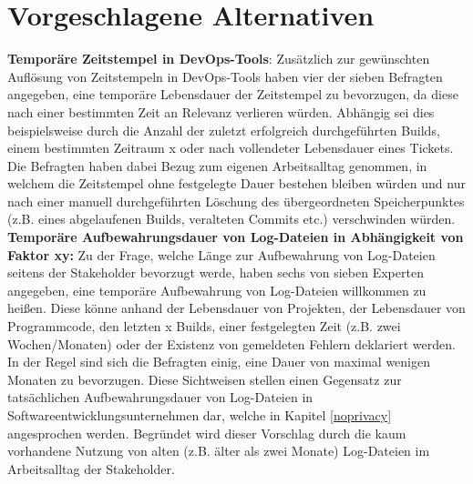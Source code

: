 \section{Vorgeschlagene Alternativen} \label{alternatives}
\textbf{Temporäre Zeitstempel in DevOps-Tools}: \newline
Zusätzlich zur gewünschten Auflösung von Zeitstempeln in DevOps-Tools haben vier der sieben Befragten angegeben, eine temporäre Lebensdauer der Zeitstempel zu bevorzugen, da diese nach einer bestimmten Zeit an Relevanz verlieren würden. Abhängig sei dies beispielsweise durch die Anzahl der zuletzt erfolgreich durchgeführten Builds, einem bestimmten Zeitraum x oder nach vollendeter Lebensdauer eines Tickets. 
Die Befragten haben dabei Bezug zum eigenen Arbeitsalltag genommen, in welchem die Zeitstempel ohne festgelegte Dauer bestehen bleiben würden und nur nach einer manuell durchgeführten Löschung des übergeordneten Speicherpunktes (z.B. eines abgelaufenen Builds, veralteten Commits etc.) verschwinden würden. \newline \newline
\textbf{Temporäre Aufbewahrungsdauer von Log-Dateien in Abhängigkeit von Faktor xy:} \newline
Zu der Frage, welche Länge zur Aufbewahrung von Log-Dateien seitens der Stakeholder bevorzugt werde, haben sechs von sieben Experten angegeben, eine temporäre Aufbewahrung von Log-Dateien willkommen zu heißen. Diese könne anhand der Lebensdauer von Projekten, der Lebensdauer von Programmcode, den letzten x Builds, einer festgelegten Zeit (z.B. zwei Wochen/Monaten)
oder der Existenz von gemeldeten Fehlern deklariert werden. In der Regel sind sich die Befragten einig, eine Dauer von maximal wenigen Monaten zu bevorzugen. \newline Diese Sichtweisen stellen einen Gegensatz zur tatsächlichen Aufbewahrungsdauer von Log-Dateien in Softwareentwicklungsunternehmen dar, welche in Kapitel \ref{noprivacy} angesprochen werden. Begründet wird dieser Vorschlag
durch die kaum vorhandene Nutzung von alten (z.B. älter als zwei Monate) Log-Dateien im Arbeitsalltag der Stakeholder.
